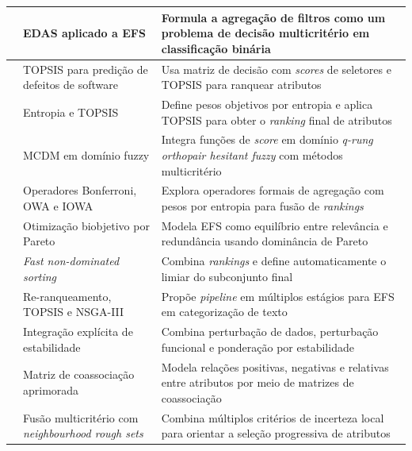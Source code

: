 \begin{longtable}{P{2.8cm}P{4.8cm}P{5.9cm}}
 &
EDAS aplicado a EFS &
Formula a agregação de filtros como um problema de decisão multicritério em classificação binária \\ \hline

 &
TOPSIS para predição de defeitos de software &
Usa matriz de decisão com \textit{scores} de seletores e TOPSIS para ranquear atributos \\ \hline

 &
Entropia e TOPSIS &
Define pesos objetivos por entropia e aplica TOPSIS para obter o \textit{ranking} final de atributos \\ \hline

 &
MCDM em domínio fuzzy &
Integra funções de \textit{score} em domínio \textit{q-rung orthopair hesitant fuzzy} com métodos multicritério \\ \hline

 &
Operadores Bonferroni, OWA e IOWA &
Explora operadores formais de agregação com pesos por entropia para fusão de \textit{rankings} \\ \hline

 &
Otimização biobjetivo por Pareto &
Modela EFS como equilíbrio entre relevância e redundância usando dominância de Pareto \\ \hline

 &
\textit{Fast non-dominated sorting} &
Combina \textit{rankings} e define automaticamente o limiar do subconjunto final \\ \hline

 &
Re-ranqueamento, TOPSIS e NSGA-III &
Propõe \textit{pipeline} em múltiplos estágios para EFS em categorização de texto \\ \hline

 &
Integração explícita de estabilidade &
Combina perturbação de dados, perturbação funcional e ponderação por estabilidade \\ \hline

 &
Matriz de coassociação aprimorada &
Modela relações positivas, negativas e relativas entre atributos por meio de matrizes de coassociação \\ \hline

 &
Fusão multicritério com \textit{neighbourhood rough sets} &
Combina múltiplos critérios de incerteza local para orientar a seleção progressiva de atributos \\ \hline


\end{longtable}
